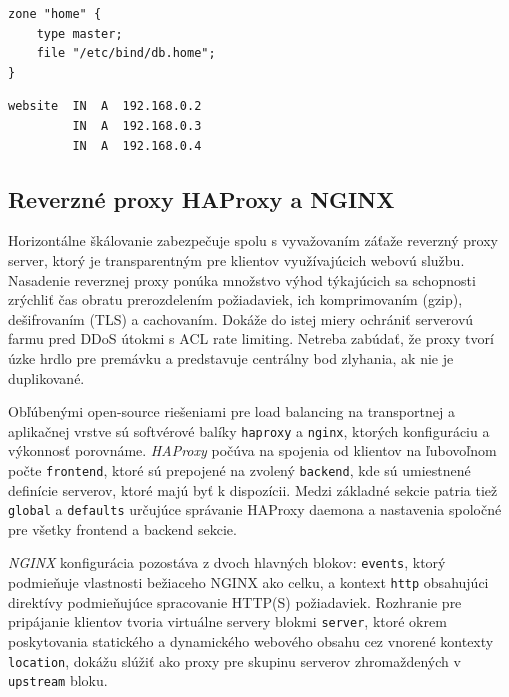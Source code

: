 \documentclass[12pt, a4paper]{article}
\begin{document}
\noindent\begin{minipage}{.48\textwidth}
\begin{lstlisting}[caption=BIND9: nastavenie DNS zóny .home]
zone "home" {
    type master;
    file "/etc/bind/db.home";
}
\end{lstlisting}
\end{minipage}\hfill
\begin{minipage}{.48\textwidth}
\begin{lstlisting}[caption=Priradenie troch DNS A záznamov pre doménu website.home]
website  IN  A  192.168.0.2
         IN  A  192.168.0.3
         IN  A  192.168.0.4
\end{lstlisting}
\end{minipage}

\subsection{Reverzné proxy HAProxy a NGINX}
Horizontálne škálovanie zabezpečuje spolu s vyvažovaním záťaže reverzný proxy server, ktorý je 
transparentným pre klientov využívajúcich webovú službu. Nasadenie reverznej proxy ponúka množstvo výhod 
týkajúcich sa schopnosti zrýchliť čas obratu prerozdelením požiadaviek, ich komprimovaním (gzip), 
dešifrovaním (TLS) a cachovaním. Dokáže do istej miery ochrániť serverovú farmu pred DDoS útokmi s ACL rate 
limiting. Netreba zabúdať, že proxy tvorí úzke hrdlo pre premávku a predstavuje 
centrálny bod zlyhania, ak nie je duplikované.

Obľúbenými open-source riešeniami pre load balancing na transportnej a aplikačnej vrstve sú softvérové
balíky \verb|haproxy| a \verb|nginx|, ktorých konfiguráciu a výkonnosť porovnáme. \emph{HAProxy} počúva na 
spojenia od klientov na ľubovoľnom počte \verb|frontend|, ktoré sú prepojené na zvolený \verb|backend|, 
kde sú umiestnené definície serverov, ktoré majú byť k dispozícii. Medzi základné sekcie patria tiež 
\verb|global| a \verb|defaults| určujúce správanie HAProxy daemona a nastavenia spoločné pre všetky
frontend a backend sekcie.

\emph{NGINX} konfigurácia pozostáva z dvoch hlavných blokov: \verb|events|, ktorý podmieňuje vlastnosti
bežiaceho NGINX ako celku, a kontext \verb|http| obsahujúci direktívy podmieňujúce
spracovanie HTTP(S) požiadaviek. Rozhranie pre pripájanie klientov tvoria virtuálne servery blokmi
\verb|server|, ktoré okrem poskytovania statického a dynamického webového obsahu cez vnorené kontexty 
\verb|location|, dokážu slúžiť ako proxy pre skupinu serverov zhromaždených v \verb|upstream| bloku.
 
\end{document}
